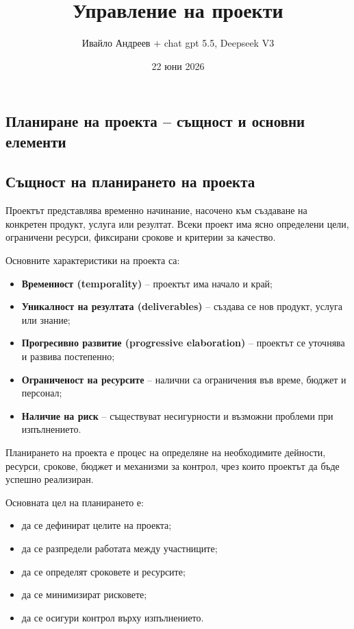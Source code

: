 \documentclass{scrartcl}
\title{Управление на проекти}
\author{Ивайло Андреев + chat gpt 5.5, Deepseek V3}
\date{22 юни 2026}
\begin{document}
\maketitle

\tableofcontents

\newpage

\begin{FlushLeft}

\section{Планиране на проекта – същност и основни елементи}

\subsection{Същност на планирането на проекта}

Проектът представлява временно начинание, насочено към създаване на конкретен продукт, услуга или резултат. Всеки проект има ясно определени цели, ограничени ресурси, фиксирани срокове и критерии за качество.

Основните характеристики на проекта са:

\begin{itemize}
    \item \textbf{Временност (temporality)} – проектът има начало и край;
    \item \textbf{Уникалност на резултата (deliverables)} – създава се нов продукт, услуга или знание;
    \item \textbf{Прогресивно развитие (progressive elaboration)} – проектът се уточнява и развива постепенно;
    \item \textbf{Ограниченост на ресурсите} – налични са ограничения във време, бюджет и персонал;
    \item \textbf{Наличие на риск} – съществуват несигурности и възможни проблеми при изпълнението.
\end{itemize}

Планирането на проекта е процес на определяне на необходимите дейности, ресурси, срокове, бюджет и механизми за контрол, чрез които проектът да бъде успешно реализиран.

Основната цел на планирането е:

\begin{itemize}
    \item да се дефинират целите на проекта;
    \item да се разпредели работата между участниците;
    \item да се определят сроковете и ресурсите;
    \item да се минимизират рисковете;
    \item да се осигури контрол върху изпълнението.
\end{itemize}


\end{FlushLeft}
\end{document}
